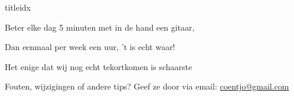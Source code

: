 \documentclass[a4,openany,portrait,tikz]{article}
\begin{document}
\begin{songs}{titleidx}
\renewcommand{\thesongnum}{Z}
	 
	 
	 
\newpage


			Beter elke dag 5 minuten met in de hand een gitaar,
			
			Dan eenmaal per week een uur, 't is echt waar!
		\endscripture	
	
		Het enige dat wij nog echt tekortkomen is schaarste 
		\endscripture	
		



	





%		
\end{songs}




%
%

Fouten, wijzigingen of andere tips? Geef ze door via email:   \href{mailto:coentjo@gmail.com}{coentjo@gmail.com} 
\end{document}
